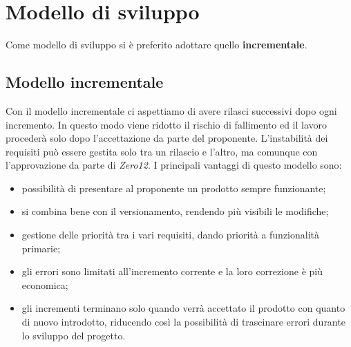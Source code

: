 \section{Modello di sviluppo}
Come modello di sviluppo si è preferito adottare quello \textbf{incrementale}.

\subsection{Modello incrementale}
Con il modello incrementale ci aspettiamo di avere rilasci successivi dopo ogni incremento. In questo modo viene ridotto il rischio di fallimento ed il lavoro procederà solo dopo l’accettazione da parte del proponente\glo{}.
L’instabilità dei requisiti può essere gestita solo tra un rilascio e l’altro, ma comunque con l’approvazione da parte di \textit{Zero12}.
I principali vantaggi di questo modello sono:
\begin{itemize}
\item possibilità di presentare al proponente un prodotto sempre funzionante;
\item si combina bene con il versionamento\glo, rendendo più visibili le modifiche;
\item gestione delle priorità tra i vari requisiti, dando priorità a funzionalità primarie;
\item gli errori sono limitati all’incremento corrente e la loro correzione è più economica;
\item gli incrementi terminano solo quando verrà accettato il prodotto con quanto di nuovo introdotto, riducendo così la possibilità di trascinare errori durante lo sviluppo del progetto.

\end{itemize}
